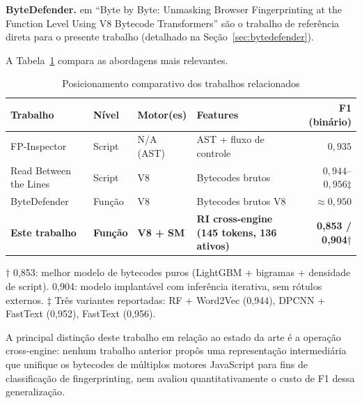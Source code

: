 \textbf{ByteDefender.}  em ``Byte by Byte:
Unmasking Browser Fingerprinting at the Function Level Using V8 Bytecode
Transformers'' são o trabalho de referência direta para o presente trabalho
(detalhado na Seção~\ref{sec:bytedefender}).

A Tabela~\ref{tab:relacionados} compara as abordagens mais relevantes.

\begin{table}[htb]
\centering
\caption{Posicionamento comparativo dos trabalhos relacionados}
\label{tab:relacionados}
\begin{tabularx}{\linewidth}{>{\raggedright\arraybackslash}X l l >{\raggedright\arraybackslash}X r}
\toprule
\textbf{Trabalho} & \textbf{Nível} & \textbf{Motor(es)} & \textbf{Features} & \textbf{F1 (binário)} \\
\midrule
FP-Inspector \cite{iqbal2021}            & Script  & N/A (AST) & AST + fluxo de controle  & $0{,}935$ \\
Read Between the Lines \cite{ghasemisharif2023} & Script & V8 & Bytecodes brutos & $0{,}944$--$0{,}956$$\ddagger$ \\
ByteDefender \cite{nikkhahbahrami2025}   & Função  & V8        & Bytecodes brutos V8      & $\approx 0{,}950$ \\
\textbf{Este trabalho}                   & \textbf{Função} & \textbf{V8 + SM} & \textbf{RI cross-engine (145 tokens, 136 ativos)} & \textbf{0,853 / 0,904$\dagger$} \\
\bottomrule
\end{tabularx}
{\footnotesize $\dagger$ 0,853: melhor modelo de bytecodes puros (LightGBM + bigramas + densidade de script).
0,904: modelo implantável com inferência iterativa, sem rótulos externos.
$\ddagger$ Três variantes reportadas: RF + Word2Vec (0,944), DPCNN + FastText (0,952), FastText (0,956).}

\end{table}

A principal distinção deste trabalho em relação ao estado da arte é a operação
cross-engine: nenhum trabalho anterior propôs uma representação intermediária que
unifique os bytecodes de múltiplos motores JavaScript para fins de classificação de
fingerprinting, nem avaliou quantitativamente o custo de F1 dessa
generalização.
